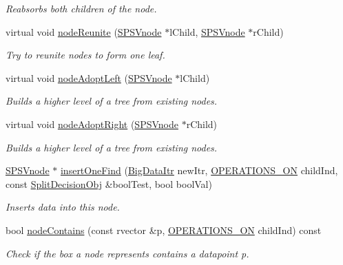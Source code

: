 \begin{DoxyCompactItemize}
\begin{DoxyCompactList}\small\item\em \-Reabsorbs both children of the node. \end{DoxyCompactList}\item 
virtual void \hyperlink{classsubpavings_1_1SPSVnode_a5abf598ead77d94aa130a8a7bf78f1f7}{node\-Reunite} (\hyperlink{classsubpavings_1_1SPSVnode}{\-S\-P\-S\-Vnode} $\ast$l\-Child, \hyperlink{classsubpavings_1_1SPSVnode}{\-S\-P\-S\-Vnode} $\ast$r\-Child)
\begin{DoxyCompactList}\small\item\em \-Try to reunite nodes to form one leaf. \end{DoxyCompactList}\item 
virtual void \hyperlink{classsubpavings_1_1SPSVnode_a928db3d7b687a9fb5d50fa135f51b040}{node\-Adopt\-Left} (\hyperlink{classsubpavings_1_1SPSVnode}{\-S\-P\-S\-Vnode} $\ast$l\-Child)
\begin{DoxyCompactList}\small\item\em \-Builds a higher level of a tree from existing nodes. \end{DoxyCompactList}\item 
virtual void \hyperlink{classsubpavings_1_1SPSVnode_a33d64bef2bd9dd7f430b732719eab71d}{node\-Adopt\-Right} (\hyperlink{classsubpavings_1_1SPSVnode}{\-S\-P\-S\-Vnode} $\ast$r\-Child)
\begin{DoxyCompactList}\small\item\em \-Builds a higher level of a tree from existing nodes. \end{DoxyCompactList}\item 
\hyperlink{classsubpavings_1_1SPSVnode}{\-S\-P\-S\-Vnode} $\ast$ \hyperlink{classsubpavings_1_1SPSVnode_a58deac20a0a5b69bb06cdc04fc059135}{insert\-One\-Find} (\hyperlink{namespacesubpavings_a8792314c11b28ac2b8c4c85c47526f3a}{\-Big\-Data\-Itr} new\-Itr, \hyperlink{namespacesubpavings_ae1ea349cda4812634df03761ebfc1c98}{\-O\-P\-E\-R\-A\-T\-I\-O\-N\-S\-\_\-\-O\-N} child\-Ind, const \hyperlink{classsubpavings_1_1SplitDecisionObj}{\-Split\-Decision\-Obj} \&bool\-Test, bool bool\-Val)
\begin{DoxyCompactList}\small\item\em \-Inserts data into this node. \end{DoxyCompactList}\item 
bool \hyperlink{classsubpavings_1_1SPSVnode_a803d11f31d86f0565dbe682a33099698}{node\-Contains} (const rvector \&p, \hyperlink{namespacesubpavings_ae1ea349cda4812634df03761ebfc1c98}{\-O\-P\-E\-R\-A\-T\-I\-O\-N\-S\-\_\-\-O\-N} child\-Ind) const 
\begin{DoxyCompactList}\small\item\em \-Check if the box a node represents contains a datapoint p. \end{DoxyCompactList}\end{DoxyCompactItemize}

